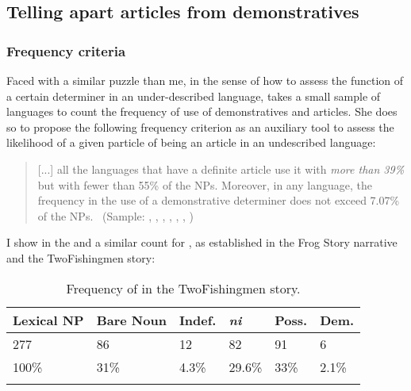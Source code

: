 \documentclass[output=paper
,modfonts
,nonflat]{langsci/langscibook}
\begin{document}
\subsection{Telling apart articles from demonstratives}\label{sec:pico:4.1}

\subsubsection{Frequency criteria}\label{sec:pico:4.1.1}

Faced with a similar puzzle than me, in the sense of how to assess the function of a certain determiner in an under-described language, \citet{Cyr1993} takes a small sample of languages to count the frequency of use of demonstratives and articles. She does so to propose the following frequency criterion as an auxiliary tool to assess the likelihood of a given particle of being an article in an undescribed language:


\begin{quotation}
	[...] all the languages that have a definite article use it with \textit{more than 39\%} but with fewer than 55\% of the NPs. Moreover, in any language, the frequency in the use of a demonstrative determiner does not exceed 7.07\% of the NPs.~\citep[222]{Cyr1993} (Sample: , , , , , , )
\end{quotation}


I show in the  and  a similar count for , as established in the Frog Story narrative and the TwoFishingmen story:

\begin{table}[h]
	\centering
	\caption{Frequency of  in the TwoFishingmen story.}
	\label{tab:pico:3}
	\begin{tabularx}{.75\textwidth}{llXXXX}
		\lsptoprule
		Lexical NP & Bare Noun & Indef. & \cellcolor[HTML]{EFEFEF}\textit{ni} & Poss.  & Dem.  \\ \midrule
		277        & 86        & 12     & 82                                  & 91     & 6     \\ 
		100\%      & 31\%      & 4.3\%  & \cellcolor[HTML]{EFEFEF}29.6\%      & 33\% & 2.1\% \\ \lspbottomrule
	\end{tabularx}
\end{table}
\end{document}
